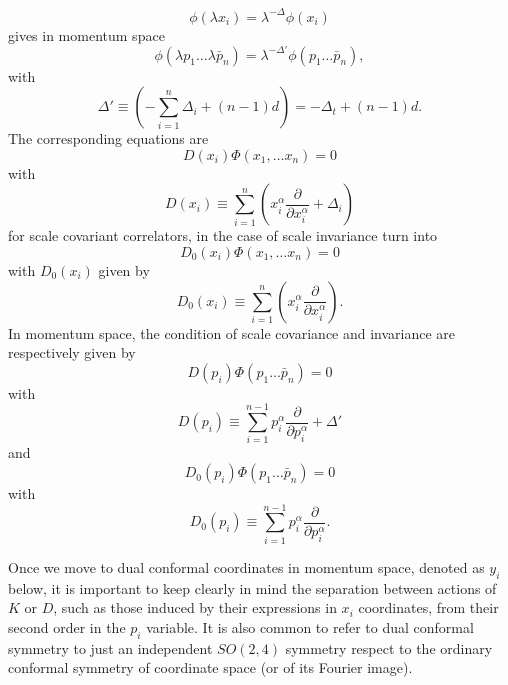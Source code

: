 \documentclass[a4paper,11pt,openright,twoside]{book}
\numberwithin{equation}{section}
\begin{document}
{\begin{equation}
	\phi(\lambda x_i)=\lambda^{-\Delta}\phi(x_i) 
\end{equation}
gives in momentum space 
\begin{equation}
	\phi(\lambda p_1\ldots \lambda \bar{p}_n)=\lambda^{-\Delta'}\phi(p_1\ldots \bar{p}_n),
\end{equation}
with 
\begin{equation}
	\Delta'\equiv \left(-\sum_{i=1}^n \Delta_i +(n-1) d\right)=-\Delta_t +(n-1) d.
\end{equation}
The corresponding equations are
\begin{equation}
	\label{scale12}
	D(x_i)
	\Phi(x_1,\ldots x_n)=0
\end{equation}
with 
\begin{equation}
	\label{scale11}
	D(x_i)\equiv\sum_{i=1}^n\left( x_i^\alpha \frac{\partial}{\partial x_i^\alpha} +\Delta_i\right)
\end{equation}
for scale covariant correlators, in the case of scale invariance turn into 
\begin{equation}
	D_0(x_i)
	\Phi(x_1,\ldots x_n)=0
\end{equation}
with $D_0(x_i)$ given by
\begin{equation}
	D_0(x_i)\equiv\sum_{i=1}^n\left( x_i^\alpha \frac{\partial}{\partial x_i^\alpha}\right). 
\end{equation}
In momentum space, the condition of scale covariance and invariance are respectively given by 
\begin{equation}
	D(p_i) \Phi(p_1\ldots \bar{p}_n)=0
\end{equation}
with
\begin{equation}
	D(p_i)\equiv\sum_{i=1}^{n-1}  p_i^\alpha \frac{\partial}{\partial p_i^\alpha} + \Delta'
\end{equation}
and 
\begin{equation}
	D_0(p_i) \Phi(p_1\ldots \bar{p}_n)=0
\end{equation}
with
\begin{equation}
	D_0(p_i)\equiv\sum_{i=1}^{n-1} p_i^\alpha \frac{\partial}{\partial p_i^\alpha} .
\end{equation}

Once we move to dual conformal coordinates in momentum space, denoted as $y_i$ below, it is important to keep clearly in mind the separation between actions of $K$ or $D$, such as those induced by their expressions in $x_i$ coordinates, from their second order in the $p_i$ variable. It is also common to refer to dual conformal symmetry to just an independent $SO(2,4)$ symmetry respect to the ordinary conformal symmetry of coordinate space (or of its Fourier image). 

}
\end{document}
